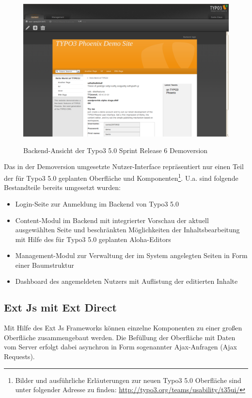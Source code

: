 \begin{figure}[!h]
\begin{center}
\label{fig.typo3backend}
\includegraphics[scale=0.239]{images/typo3/backend.png}
\caption{Backend-Ansicht der Typo3 5.0 Sprint Release 6 Demoversion}
\end{center}
\end{figure}
\newpage
Das in der Demoversion umgesetzte Nutzer-Interface repräsentiert nur einen Teil der für Typo3 5.0 geplanten Oberfläche und Komponenten\footnote{Bilder und ausführliche Erläuterungen zur neuen Typo3 5.0 Oberfläche sind unter folgender Adresse zu finden: \href{http://typo3.org/teams/usability/t35ui/}{http://typo3.org/teams/usability/t35ui/}}. U.a. sind folgende Bestandteile bereits umgesetzt wurden:
\begin{itemize}
\item
Login-Seite zur Anmeldung im Backend von Typo3 5.0
\item
Content-Modul im Backend mit integrierter Vorschau der aktuell ausgewählten Seite und beschränkten Möglichkeiten der
Inhaltsbearbeitung mit Hilfe des für Typo3 5.0 geplanten Aloha-Editors
\item
Management-Modul zur Verwaltung der im System angelegten Seiten in Form einer Baumstruktur
\item
Dashboard des angemeldeten Nutzers mit Auflistung der editierten Inhalte
\end{itemize}


\subsection{Ext Js mit Ext Direct}
Mit Hilfe des Ext Js Frameworks können einzelne Komponenten zu einer großen Oberfläche zusammengebaut werden. Die Befüllung der Oberfläche mit Daten vom Server erfolgt dabei asynchron in Form sogenannter Ajax-Anfragen (Ajax Requests).

